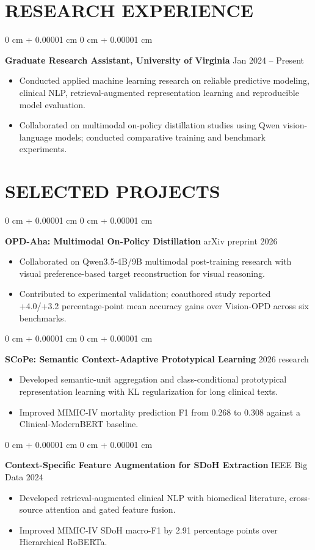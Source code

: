\documentclass[10pt, letterpaper]{article}
\newenvironment{highlights}{
    \begin{itemize}[
        topsep=0.02 cm,
        parsep=0 cm,
        partopsep=0pt,
        itemsep=0pt,
        leftmargin=0 cm + 10pt
    ]
}{
    \end{itemize}
} %
\newenvironment{onecolentry}{
    \begin{adjustwidth}{
        0 cm + 0.00001 cm
    }{
        0 cm + 0.00001 cm
    }
}{
    \end{adjustwidth}
} %
\begin{document}
\section{RESEARCH EXPERIENCE}
\begin{onecolentry}
\textbf{Graduate Research Assistant, University of Virginia} \hfill Jan 2024 -- Present
\begin{highlights}
\item Conducted applied machine learning research on reliable predictive modeling, clinical NLP, retrieval-augmented representation learning and reproducible model evaluation.
\item Collaborated on multimodal on-policy distillation studies using Qwen vision-language models; conducted comparative training and benchmark experiments.
\end{highlights}
\end{onecolentry}
\section{SELECTED PROJECTS}
\begin{onecolentry}
\textbf{OPD-Aha: Multimodal On-Policy Distillation} \hfill arXiv preprint 2026
\begin{highlights}
\item Collaborated on Qwen3.5-4B/9B multimodal post-training research with visual preference-based target reconstruction for visual reasoning.
\item Contributed to experimental validation; coauthored study reported +4.0/+3.2 percentage-point mean accuracy gains over Vision-OPD across six benchmarks.
\end{highlights}
\end{onecolentry}
\vspace{0.04 cm}
\begin{onecolentry}
\textbf{SCoPe: Semantic Context-Adaptive Prototypical Learning} \hfill 2026 research
\begin{highlights}
\item Developed semantic-unit aggregation and class-conditional prototypical representation learning with KL regularization for long clinical texts.
\item Improved MIMIC-IV mortality prediction F1 from 0.268 to 0.308 against a Clinical-ModernBERT baseline.
\end{highlights}
\end{onecolentry}
\vspace{0.04 cm}
\begin{onecolentry}
\textbf{Context-Specific Feature Augmentation for SDoH Extraction} \hfill IEEE Big Data 2024
\begin{highlights}
\item Developed retrieval-augmented clinical NLP with biomedical literature, cross-source attention and gated feature fusion.
\item Improved MIMIC-IV SDoH macro-F1 by 2.91 percentage points over Hierarchical RoBERTa.
\end{highlights}
\end{onecolentry}
\vspace{0.04 cm}
\end{document}
